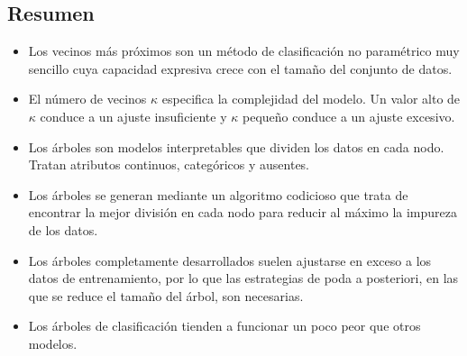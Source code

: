 \subsection{Resumen}
\begin{itemize}
\item Los vecinos más próximos son un método de clasificación no paramétrico muy sencillo cuya capacidad expresiva crece con el tamaño del conjunto de datos.
\item El número de vecinos $\kappa$ especifica la complejidad del modelo. Un valor alto de $\kappa$ conduce a un ajuste insuficiente y $\kappa$ pequeño conduce a un ajuste excesivo.
\item Los árboles son modelos interpretables que dividen los datos en cada nodo. Tratan atributos continuos, categóricos y ausentes.
\item Los árboles se generan mediante un algoritmo codicioso que trata de encontrar la mejor división en cada nodo para reducir al máximo la impureza de los datos.
\item Los árboles completamente desarrollados suelen ajustarse en exceso a los datos de entrenamiento, por lo que las estrategias de poda a posteriori, en las que se reduce el tamaño del árbol, son necesarias. 
\item Los árboles de clasificación tienden a funcionar un poco peor que otros modelos.
\end{itemize} 